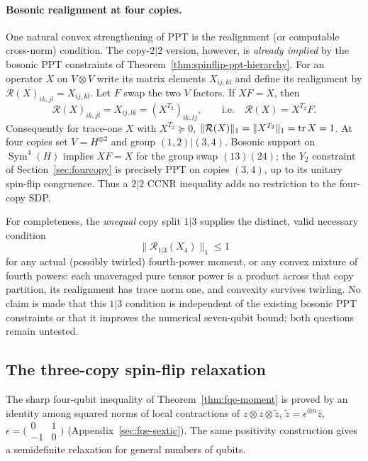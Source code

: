 \paragraph{Bosonic realignment at four copies.}
One natural convex strengthening of PPT is the realignment
(or computable cross-norm) condition. The copy-$2|2$
version, however, is \emph{already implied} by the
bosonic PPT constraints of
Theorem~\ref{thm:spinflip-ppt-hierarchy}.
For an operator $X$ on $V\otimes V$ write its matrix
elements $X_{ij,kl}$ and define its realignment by
$\mathcal R(X)_{ik,jl}=X_{ij,kl}$.
Let $F$ swap the two $V$ factors. If $XF=X$, then
\[
   \mathcal R(X)_{ik,jl}
     =X_{ij,lk}
     =(X^{T_2})_{ik,lj},
   \qquad\text{i.e.}\quad
   \boxed{\mathcal R(X)=X^{T_2}F}.
\]
Consequently for trace-one $X$ with $X^{T_2}\succeq0$,
$\|\mathcal R(X)\|_1=\|X^{T_2}\|_1=\operatorname{tr} X=1$.
At four copies set $V=H^{\otimes2}$ and group
$(1,2)|(3,4)$. Bosonic support on
$\operatorname{Sym}^4(H)$ implies $XF=X$
for the group swap $(13)(24)$; the $Y_2$
constraint of Section~\ref{sec:fourcopy} is precisely PPT on copies $(3,4)$,
up to its unitary spin-flip congruence.
Thus a $2|2$ CCNR inequality adds no restriction
to the four-copy SDP.

For completeness, the \emph{unequal} copy split
$1|3$ supplies the distinct, valid necessary
condition
\[
                   \|\mathcal R_{1|3}(X_4)\|_1\le1
\]
for any actual (possibly twirled) fourth-power
moment, or any convex mixture of fourth powers:
each unaveraged pure tensor power is a product
across that copy partition, its realignment has
trace norm one, and convexity survives twirling.
No claim is made that this $1|3$ condition is
independent of the existing bosonic PPT constraints
or that it improves the numerical seven-qubit bound;
both questions remain untested.

\subsection{The three-copy spin-flip relaxation}\label{sec:threecopy}

The sharp four-qubit inequality of Theorem~\ref{thm:fqe-moment} is proved by an identity among squared norms of local contractions
of $z\otimes z\otimes\tilde z$, $\tilde z=\epsilon^{\otimes n}\bar z$, $\epsilon=\bigl(\begin{smallmatrix}0&1\\-1&0\end{smallmatrix}\bigr)$
(Appendix~\ref{sec:fqe-sextic}). The same positivity construction gives a semidefinite relaxation for general numbers of qubits.

